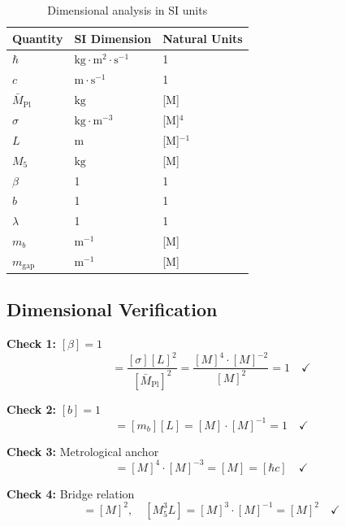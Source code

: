 \documentclass[11pt,a4paper]{article}
\begin{document}
\begin{table}[h]
\centering
\caption{Dimensional analysis in SI units}
\label{tab:SI-dim}
\begin{tabular}{lll}
\toprule
Quantity & SI Dimension & Natural Units \\
\midrule
$\hbar$ & $\text{kg} \cdot \text{m}^2 \cdot \text{s}^{-1}$ & 1 \\
$c$ & $\text{m} \cdot \text{s}^{-1}$ & 1 \\
$\bar{M}_{\text{Pl}}$ & $\text{kg}$ & [M] \\
$\sigma$ & $\text{kg} \cdot \text{m}^{-3}$ & [M]$^4$ \\
$L$ & m & [M]$^{-1}$ \\
$M_5$ & $\text{kg}$ & [M] \\
$\beta$ & 1 & 1 \\
$b$ & 1 & 1 \\
$\lambda$ & 1 & 1 \\
$m_b$ & $\text{m}^{-1}$ & [M] \\
$m_{\text{gap}}$ & $\text{m}^{-1}$ & [M] \\
\bottomrule
\end{tabular}
\end{table}

\subsection{Dimensional Verification}

\textbf{Check 1:} $[\beta] = 1$
\begin{equation}
  [\beta] = \frac{[\sigma][L]^2}{[\bar{M}_{\text{Pl}}]^2}
          = \frac{[M]^4 \cdot [M]^{-2}}{[M]^2} = 1 \quad \checkmark
  \label{eq:dim-beta}
\end{equation}

\textbf{Check 2:} $[b] = 1$
\begin{equation}
  [b] = [m_b][L] = [M] \cdot [M]^{-1} = 1 \quad \checkmark
  \label{eq:dim-b}
\end{equation}

\textbf{Check 3:} Metrological anchor
\begin{equation}
  [\sigma L^3] = [M]^4 \cdot [M]^{-3} = [M] = [\hbar c] \quad \checkmark
  \label{eq:dim-anchor}
\end{equation}

\textbf{Check 4:} Bridge relation
\begin{equation}
  [\bar{M}_{\text{Pl}}^2] = [M]^2, \quad [M_5^3 L] = [M]^3 \cdot [M]^{-1} = [M]^2 \quad \checkmark
  \label{eq:dim-bridge}
\end{equation}
\end{document}
